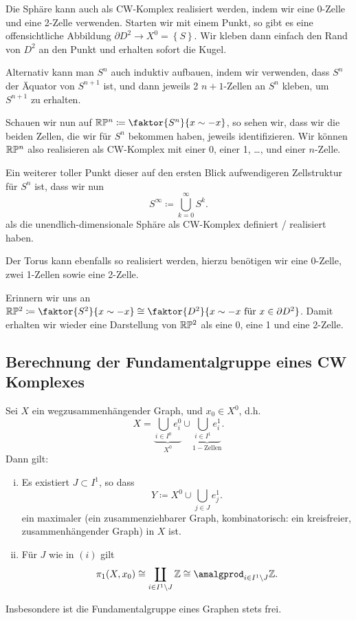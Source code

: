 \begin{example}
    Die Sphäre kann auch als CW-Komplex realisiert werden, indem wir eine 0-Zelle und eine 2-Zelle verwenden. Starten wir mit einem Punkt, so gibt es eine offensichtliche Abbildung $\partial D^2 \to  X^0 = \left \{S\right\} $. Wir kleben dann einfach den Rand von $D^2$ an den Punkt und erhalten sofort die Kugel.

    Alternativ kann man $S^n$ auch induktiv aufbauen, indem wir verwenden, dass  $S^n$ der Äquator von  $S^{n+1}$ ist, und dann jeweils 2 $n+1$-Zellen an  $S^n$ kleben, um  $S^{n+1}$ zu erhalten.

    Schauen wir nun auf $\R\mathbb{P}^n \coloneqq  \faktor{S^n}{x \sim -x}$, so sehen wir, dass wir die beiden Zellen, die wir für $S^n$ bekommen haben, jeweils identifizieren. Wir können  $\mathbb{R}\mathbb{P}^n$ also realisieren als CW-Komplex mit einer 0, einer 1, \ldots, und einer $n$-Zelle.

    Ein weiterer toller Punkt dieser auf den ersten Blick aufwendigeren Zellstruktur für  $S^n $ ist, dass wir nun
    \[
    S^{\infty} \coloneqq  \bigcup_{k=0}^{\infty} S^k 
    .\] 
    als die unendlich-dimensionale Sphäre als CW-Komplex definiert / realisiert haben.

    Der Torus kann ebenfalls so realisiert werden, hierzu benötigen wir eine 0-Zelle, zwei 1-Zellen sowie eine 2-Zelle.

    Erinnern wir uns an $\R\mathbb{P}^2 \coloneqq  \faktor{S^2}{x \sim  -x} \cong \faktor{D^2}{x \sim  -x \text{ für }x \in \partial D^2}$. Damit erhalten wir wieder eine Darstellung von $\mathbb{R}\mathbb{P}^2$ als eine 0, eine 1 und eine 2-Zelle.
\end{example}


\subsection{Berechnung der Fundamentalgruppe eines CW Komplexes}

\begin{theorem}[Graphen]\label{thm:fundamentalgruppe-von-graphen}
    Sei $X$ ein wegzusammenhängender Graph, und  $x_0\in X^0$, d.h.
    \[
    X = \underbrace{\bigcup_{i \in  I^0} e_i^0 }_{X^0} \cup \underbrace{\bigcup_{i \in  I^1} e_i^1
}_{1-\text{Zellen}} 
    .\]
    Dann gilt:
    \begin{enumerate}[(i)]
        \item Es existiert $J\subset I^1$, so dass
            \[
            Y \coloneqq  X^0 \cup \bigcup_{j\in J} e_j^1
            .\] 
            ein maximaler  (ein zusammenziehbarer Graph, kombinatorisch: ein kreisfreier, zusammenhängender Graph) in $X$ ist. 
        \item Für $J$ wie in  $(i)$ gilt
             \[
                 \pi_1(X,x_0) \cong \coprod_{i\in I^1 \setminus J} \Z \cong \amalgprod_{i\in I^1 \setminus J} \Z
            .\] 
    \end{enumerate}
    Insbesondere ist die Fundamentalgruppe eines Graphen stets frei.
\end{theorem}

